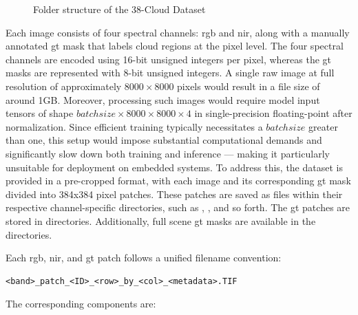 {\begin{figure}[H]
\caption{Folder structure of the 38-Cloud Dataset}
\label{fig:dsFolderStruct}
\end{figure}

Each image consists of four spectral channels: \gls{rgb} and \gls{nir}, along with a manually annotated \gls{gt} mask that labels cloud regions at the pixel level.
The four spectral channels are encoded using 16-bit unsigned integers per pixel, whereas the \gls{gt} masks are represented with 8-bit unsigned integers.
A single raw image at full resolution of approximately \ensuremath{8000\times8000} pixels would result in a file size of around 1GB.
Moreover, processing such images would require model input tensors of shape \ensuremath{batchsize\times8000\times8000\times4} in single-precision floating-point after normalization.
Since efficient training typically necessitates a \ensuremath{batchsize} greater than one,
this setup would impose substantial computational demands and significantly slow down both training and inference --- making it particularly unsuitable for deployment on embedded systems.
To address this, the dataset is provided in a pre-cropped format, with each image and its corresponding \gls{gt} mask divided into 384x384 pixel patches.
These patches are saved as  files within their respective channel-specific directories, such as , , and so forth.
The \gls{gt} patches are stored in  directories. Additionally, full scene \gls{gt} masks are available in the  directories.

\newpage

Each \gls{rgb}, \gls{nir}, and \gls{gt} patch follows a unified filename convention:

\begin{lstlisting}
<band>_patch_<ID>_<row>_by_<col>_<metadata>.TIF
\end{lstlisting}

The corresponding components are:

}
